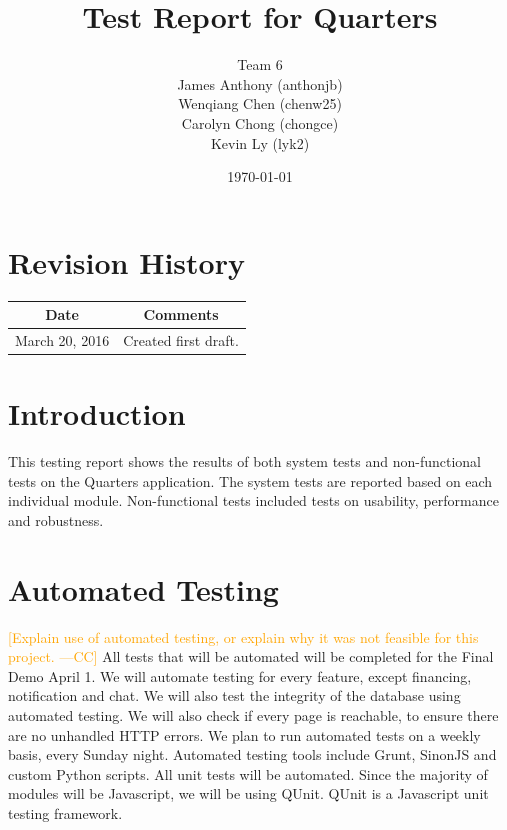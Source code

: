 \documentclass[12pt]{article}
\newcommand{\authornote}[3]{\textcolor{#1}{[#3 ---#2]}}
\newcommand{\authornote}[3]{}
\newcommand{\cc}[1]{\authornote{orange}{CC}{#1}}
\begin{document}
\title{Test Report for Quarters} 
\author{Team 6\\ James Anthony (anthonjb)\\ Wenqiang Chen (chenw25)\\ Carolyn Chong 
(chongce)\\ Kevin Ly (lyk2)}
\date{\today}
  
\maketitle

\pagebreak

\tableofcontents
\listoffigures
\listoftables

\section*{Revision History}
\begin{tabular}{|c|c|}
\hline
\textbf{Date}  & \textbf{Comments} \\ \hline
March 20, 2016 & Created first draft. \\ 
\hline
\end{tabular}

\pagebreak


\section{Introduction}
This testing report shows the results of both system tests and non-functional tests on the Quarters application. The system tests are reported based on each individual module. Non-functional tests included tests on usability, performance and robustness.

\section{Automated Testing}
\cc{Explain use of automated testing, or explain why it was not feasible for this project.}
All tests that will be automated will be completed for the Final Demo April 1. We will automate testing for every feature, except financing, notification and chat. We will also test the integrity of the database using automated testing. We will also check if every page is reachable, to ensure there are no unhandled HTTP errors. We plan to run automated tests on a weekly basis, every Sunday night. Automated testing tools include Grunt, SinonJS and custom Python scripts. All unit tests will be automated. Since the majority of modules will be Javascript, we will be using QUnit. QUnit is a Javascript unit testing framework. 
\end{document}
